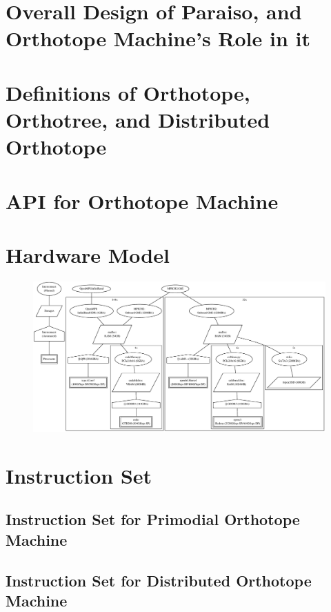 \documentclass[twocolumn]{article}
\begin{document}
\section{Overall Design of Paraiso, and Orthotope Machine's Role in it}


\section{Definitions of Orthotope, Orthotree, and Distributed Orthotope}

\section{API for Orthotope Machine}


\section{Hardware Model}

\begin{figure}
  \begin{center}
    \includegraphics[scale=0.3]{hardware_graph.eps}
  \end{center}
\end{figure}

\section{Instruction Set}
\subsection{Instruction Set for Primodial Orthotope Machine}
\subsection{Instruction Set for Distributed Orthotope Machine}
\end{document}
